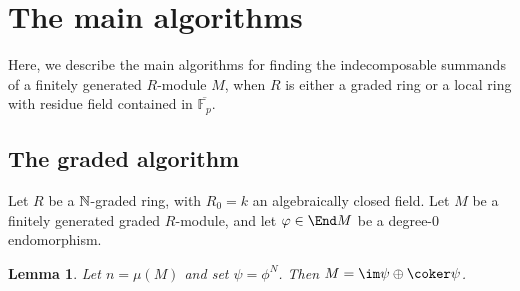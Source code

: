 \documentclass[12pt]{article}
\let\b\beta
\def\FF{\mathbb F}
\def\ZZ{\mathbb Z}
\theoremstyle{theorem}
\numberwithin{thm}{section}
\newtheorem{lem}[thm]{Lemma}
\theoremstyle{definition}
\begin{document}
\section{The main algorithms}
Here, we describe the main algorithms for finding the indecomposable summands of a finitely generated $R$-module $M$, when $R$ is either a graded ring or a local ring with residue field contained in $\overline{\FF_p}$.

\subsection{The graded algorithm}\label{sec:main-alg-new}
Let $R$ be a $\mathbb N$-graded ring, with $R_0=k$ an algebraically closed field.
Let $M$ be a finitely generated graded $R$-module, and let $\phi \in \End M$ be a degree-0 endomorphism.






\begin{lem}
\label{graded_algorithm}
Let $n=\mu(M)$ and set $\psi=\phi^N$. Then $M=\im \psi \oplus \coker \psi$.
\end{lem}
\end{document}
